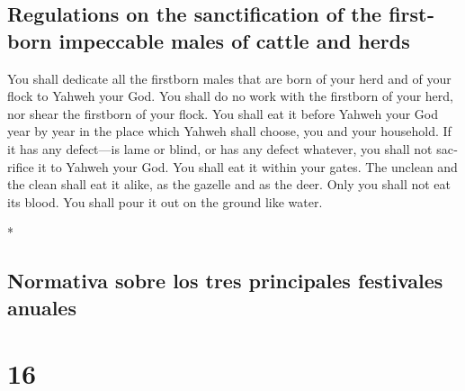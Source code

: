 \begin{paracol}{2}
\begin{otherlanguage}{english}
\hypertarget{regulations-on-the-sanctification-of-the-firstborn-impeccable-males-of-cattle-and-herds}{%
\subsection{Regulations on the sanctification of the firstborn
impeccable males of cattle and
herds}\label{regulations-on-the-sanctification-of-the-firstborn-impeccable-males-of-cattle-and-herds}}

 You shall dedicate all the firstborn males that are born
of your herd and of your flock to Yahweh your God. You shall do no work
with the firstborn of your herd, nor shear the firstborn of your flock.
 You shall eat it before Yahweh your God year by year in
the place which Yahweh shall choose, you and your household.
 If it has any defect---is lame or blind, or has any
defect whatever, you shall not sacrifice it to Yahweh your God.
 You shall eat it within your gates. The unclean and the
clean shall eat it alike, as the gazelle and as the deer.
 Only you shall not eat its blood. You shall pour it out
on the ground like water.

\end{otherlanguage}

\switchcolumn[0]*

\hypertarget{normativa-sobre-los-tres-principales-festivales-anuales}{%
\subsection{Normativa sobre los tres principales festivales
anuales}\label{normativa-sobre-los-tres-principales-festivales-anuales}}

\hypertarget{section-30}{%
\section{16}\label{section-30}}


\end{paracol}
